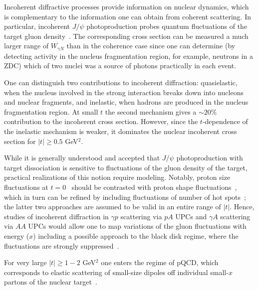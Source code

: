 \documentclass[../report.tex]{subfiles}
\begin{document}

Incoherent diffractive processes provide information on nuclear dynamics,  which is complementary to the 
information one can obtain from 
coherent scattering. In particular, incoherent $J/\psi$ photoproduction  probes quantum fluctuations of the target gluon density~\cite{Frankfurt:2008vi,Mantysaari:2016ykx,Mantysaari:2016jaz,Mantysaari:2017dwh,Cepila:2016uku,Cepila:2017nef}.
The corresponding cross section can be measured a much larger range of $W_{\gamma N}$ than in the coherence case since one can 
determine  (by detecting activity in the nucleus fragmentation region, for example, neutrons in a ZDC) which of two nuclei was a source of photons practically in each event.

One can distinguish two contributions to incoherent diffraction: 
quasielastic, when the nucleus involved in the strong interaction breaks down into nucleons and nuclear fragments, 
and inelastic, when hadrons are produced in the nucleus fragmentation  region.
At small $t$ the second  mechanism gives a $\sim 20\% $ contribution to the incoherent cross section. However, since the $t$-dependence of the inelastic  mechanism is weaker, it dominates the nuclear incoherent cross section for $|t| \ge 0.5$ GeV$^2$. 

While it is generally understood and accepted that $J/\psi$ photoproduction with target dissociation is sensitive to fluctuations
of the gluon density of the target, practical realizations of this notion require modeling. Notably, 
proton size fluctuations at $t=0$~\cite{Frankfurt:2008vi} should be contrasted with proton shape fluctuations~\cite{Mantysaari:2016ykx,Mantysaari:2016jaz,Mantysaari:2017dwh}, which in turn
can be refined by including fluctuations of number of hot spots~\cite{Cepila:2016uku,Cepila:2017nef}; the latter two approaches 
are assumed to be valid in an entire range of $|t|$.
Hence, studies of incoherent diffraction
in $\gamma p$ scattering via $pA$ UPCs and $\gamma A$ scattering via $AA$ UPCs would allow one to map variations of the gluon fluctuations with energy ($x$) including a possible approach to the black disk regime, where the 
fluctuations are strongly suppressed~\cite{Cepila:2016uku}.

For very large $|t| \ge 1 - 2$ GeV$^2$ one enters the regime of pQCD, which corresponds to elastic scattering of small-size dipoles
off individual small-$x$ partons of the nuclear target~\cite{Frankfurt:2008et,Frankfurt:2008er}.
\end{document}
